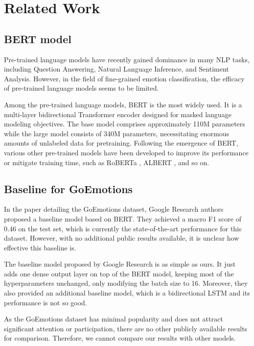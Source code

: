 \documentclass{article}
\begin{document}
\newpage
\section{Related Work}

\subsection{BERT model}

Pre-trained language models have recently gained dominance in many NLP tasks, including Question Answering, Natural Language Inference, and Sentiment Analysis. However, in the field of fine-grained emotion classification, the efficacy of pre-trained language models seems to be limited.

Among the pre-trained language models, BERT \cite{bert} is the most widely used. It is a multi-layer bidirectional Transformer encoder designed for masked language modeling objectives. The base model comprises approximately 110M parameters while the large model consists of 340M parameters, necessitating enormous amounts of unlabeled data for pretraining. Following the emergence of BERT, various other pre-trained models have been developed to improve its performance or mitigate training time, such as RoBERTa \cite{roberta}, ALBERT \cite{albert}, and so on.

\subsection{Baseline for GoEmotions}

In the paper \cite{goemotions} detailing the GoEmotions dataset, Google Research authors proposed a baseline model based on BERT. They achieved a macro F1 score of 0.46 on the test set, which is currently the state-of-the-art performance for this dataset. However, with no additional public results available, it is unclear how effective this baseline is.

The baseline model proposed by Google Research is as simple as ours. It just adds one dense output layer on top of the BERT model, keeping most of the hyperparameters unchanged, only modifying the batch size to 16. Moreover, they also provided an additional baseline model, which is a bidirectional LSTM and its performance is not so good.

As the GoEmotions dataset has minimal popularity and does not attract significant attention or participation, there are no other publicly available results for comparison. Therefore, we cannot compare our results with other models.
\end{document}
